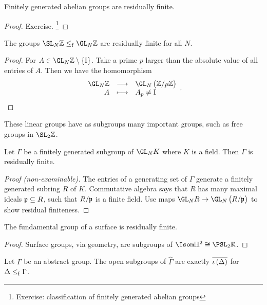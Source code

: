 \begin{proposition}
Finitely generated abelian groups are residually finite.
\end{proposition}

\begin{proof}
Exercise. \footnote{Exercise: classification of finitely generated abelian groups}
\end{proof}

\begin{proposition}
The groups $ \SL_N \ZZ \le_\f \GL_N \ZZ $ are residually finite for all $ N $.
\end{proposition}

\begin{proof}
For $ A \in \GL_N \ZZ \setminus \cbr{\I} $. Take a prime $ p $ larger than the absolute value of all entries of $ A $. Then we have the homomorphism
$$ \function{\GL_N \ZZ}{\GL_N \br{\ZZ / p\ZZ}}{A}{A_p \ne \I}. $$
\end{proof}

These linear groups have as subgroups many important groups, such as free groups in $ \SL_2 \ZZ $.

\begin{theorem}
Let $ \Gamma $ be a finitely generated subgroup of $ \GL_N K $ where $ K $ is a field. Then $ \Gamma $ is residually finite.
\end{theorem}

\begin{proof}[Proof (non-examinable)]
The entries of a generating set of $ \Gamma $ generate a finitely generated subring $ R $ of $ K $. Commutative algebra says that $ R $ has many maximal ideals $ \mathfrak{p} \subseteq R $, such that $ R / \mathfrak{p} $ is a finite field. Use maps $ \GL_N R \to \GL_N \br{R / \ppp} $ to show residual finiteness.
\end{proof}

\begin{proposition}
The fundamental group of a surface is residually finite.
\end{proposition}

\begin{proof}
Surface groups, via geometry, are subgroups of $ \Isom \HH^2 \cong \PSL_2 \RR $.
\end{proof}

\pagebreak

\begin{lemma}
Let $ \Gamma $ be an abstract group. The open subgroups of $ \widehat{\Gamma} $ are exactly $ \overline{\iota\br{\Delta}} $ for $ \Delta \le_{\mathrm{f}} \Gamma $.
\end{lemma}

